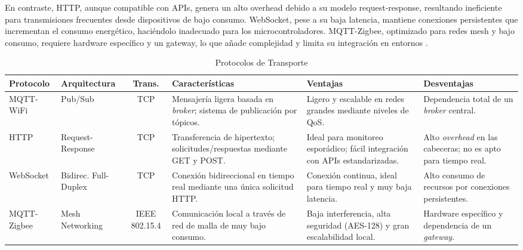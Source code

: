 En contraste, HTTP, aunque compatible con APIs, genera un alto overhead debido a su modelo 
request-response, resultando ineficiente para transmisiones frecuentes desde dispositivos de bajo 
consumo. WebSocket, pese a su baja latencia, mantiene conexiones persistentes que incrementan el 
consumo energético, haciéndolo inadecuado para los microcontroladores. MQTT-Zigbee, optimizado para redes 
mesh y bajo consumo, requiere hardware específico y un gateway, lo que añade complejidad y limita su 
integración en entornos .
\begin{table}[htbp]
\centering
\caption{Protocolos de Transporte}
\label{tab:protocolo}
\begingroup
\setlength{\tabcolsep}{3pt} %
\renewcommand{\arraystretch}{1.5} %
\footnotesize

\begin{tabularx}{\textwidth}{|l|l|c|>{\raggedright\arraybackslash}X|>{\raggedright\arraybackslash}X|>{\raggedright\arraybackslash}X|}
\hline
\textbf{Protocolo} & \textbf{Arquitectura} & \textbf{Trans.} & \textbf{Características} & \textbf{Ventajas} & \textbf{Desventajas} \\ \hline

MQTT-WiFi\cite{zotero-item-80} & Pub/Sub & TCP & Mensajería ligera basada en \textit{broker}; sistema de publicación por tópicos. & Ligero y escalable en redes grandes mediante niveles de QoS. & Dependencia total de un \textit{broker} central. \\ \hline

HTTP\cite{2025a} & Request-Response & TCP & Transferencia de hipertexto; solicitudes/respuestas mediante GET y POST. & Ideal para monitoreo esporádico; fácil integración con APIs estandarizadas. & Alto \textit{overhead} en las cabeceras; no es apto para tiempo real. \\ \hline

WebSocket\cite{2025b} & Bidirec. Full-Duplex & TCP & Conexión bidireccional en tiempo real mediante una única solicitud HTTP. & Conexión continua, ideal para tiempo real y muy baja latencia. & Alto consumo de recursos por conexiones persistentes. \\ \hline

MQTT-Zigbee\cite{AllianInc.2015} & Mesh Networking & IEEE 802.15.4 & Comunicación local a través de red de malla de muy bajo consumo. & Baja interferencia, alta seguridad (AES-128) y gran escalabilidad local. & Hardware específico y dependencia de un \textit{gateway}. \\ \hline

\end{tabularx}
\endgroup
\end{table}

